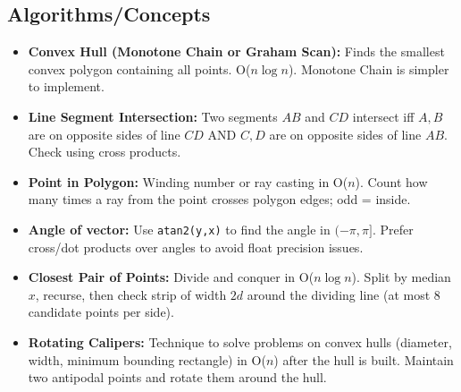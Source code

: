 \subsection{Algorithms/Concepts}

\begin{itemize}
    \item \textbf{Convex Hull (Monotone Chain or Graham Scan): }Finds the smallest convex polygon containing all points. O($n \log n$). Monotone Chain is simpler to implement.
    \item \textbf{Line Segment Intersection: }Two segments $AB$ and $CD$ intersect iff $A, B$ are on opposite sides of line $CD$ AND $C, D$ are on opposite sides of line $AB$. Check using cross products.
    \item \textbf{Point in Polygon: }Winding number or ray casting in O($n$). Count how many times a ray from the point crosses polygon edges; odd = inside.
    \item \textbf{Angle of vector: }Use \texttt{atan2(y,x)} to find the angle in $(-\pi, \pi]$. Prefer cross/dot products over angles to avoid float precision issues.
    \item \textbf{Closest Pair of Points: }Divide and conquer in O($n \log n$). Split by median $x$, recurse, then check strip of width $2d$ around the dividing line (at most 8 candidate points per side).
    \item \textbf{Rotating Calipers: }Technique to solve problems on convex hulls (diameter, width, minimum bounding rectangle) in O($n$) after the hull is built. Maintain two antipodal points and rotate them around the hull.
\end{itemize}